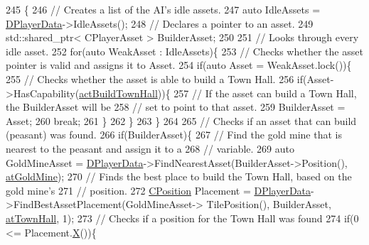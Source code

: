 \begin{DoxyCode}
245                                                            \{
246     \textcolor{comment}{// Creates a list of the AI's idle assets.}
247     \textcolor{keyword}{auto} IdleAssets = \hyperlink{classCAIPlayer_a83b5113c8f7e80df54940b647c5ee2e6}{DPlayerData}->IdleAssets();
248     \textcolor{comment}{// Declares a pointer to an asset.}
249     std::shared\_ptr< CPlayerAsset > BuilderAsset;
250     
251     \textcolor{comment}{// Looks through every idle asset.}
252     \textcolor{keywordflow}{for}(\textcolor{keyword}{auto} WeakAsset : IdleAssets)\{
253         \textcolor{comment}{// Checks whether the asset pointer is valid and assigns it to Asset.}
254         \textcolor{keywordflow}{if}(\textcolor{keyword}{auto} Asset = WeakAsset.lock())\{
255             \textcolor{comment}{// Checks whether the asset is able to build a Town Hall.}
256             \textcolor{keywordflow}{if}(Asset->HasCapability(\hyperlink{GameDataTypes_8h_a35b98ce26aca678b03c6f9f76e4778cea0b5f001e8c77b8a87998da6320595498}{actBuildTownHall}))\{
257                 \textcolor{comment}{// If the asset can build a Town Hall, the BuilderAsset will be }
258                 \textcolor{comment}{// set to point to that asset.}
259                 BuilderAsset = Asset;
260                 \textcolor{keywordflow}{break};
261             \}
262         \}
263     \}
264 
265     \textcolor{comment}{// Checks if an asset that can build (peasant) was found.}
266     \textcolor{keywordflow}{if}(BuilderAsset)\{
267         \textcolor{comment}{// Find the gold mine that is nearest to the peasant and assign it to a}
268         \textcolor{comment}{// variable.}
269         \textcolor{keyword}{auto} GoldMineAsset = \hyperlink{classCAIPlayer_a83b5113c8f7e80df54940b647c5ee2e6}{DPlayerData}->FindNearestAsset(BuilderAsset->Position(), 
      \hyperlink{GameDataTypes_8h_a5600d4fc433b83300308921974477feca243d9ba44092eadd561db058d742b3b3}{atGoldMine});
270         \textcolor{comment}{// Finds the best place to build the Town Hall, based on the gold mine's}
271         \textcolor{comment}{// position.}
272         \hyperlink{classCPosition}{CPosition} Placement = \hyperlink{classCAIPlayer_a83b5113c8f7e80df54940b647c5ee2e6}{DPlayerData}->FindBestAssetPlacement(GoldMineAsset->
      TilePosition(), BuilderAsset, \hyperlink{GameDataTypes_8h_a5600d4fc433b83300308921974477feca5c0fa8a0f367f3358365536d3c7aa321}{atTownHall}, 1);
273         \textcolor{comment}{// Checks if a position for the Town Hall was found}
274         \textcolor{keywordflow}{if}(0 <= Placement.\hyperlink{classCPosition_a9a6b94d3b91df1492d166d9964c865fc}{X}())\{

\end{DoxyCode}
